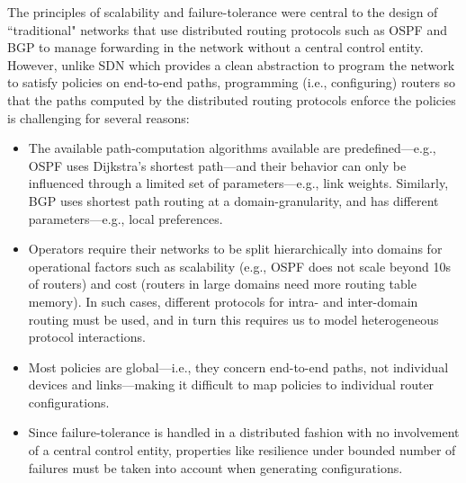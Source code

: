 The principles of scalability and failure-tolerance 
were central to the design
of ``traditional" networks that use distributed
routing protocols such as OSPF and BGP 
to manage forwarding in the 
network without a central control entity.
However, unlike SDN which provides a clean abstraction
to program the network to satisfy policies 
on end-to-end paths,
programming (i.e., configuring) 
routers so that the paths computed by
the distributed routing protocols enforce the 
policies is challenging for several reasons: 
\begin{itemize}
\item The available path-computation algorithms
available are predefined---e.g., OSPF uses
Dijkstra's shortest path---and their behavior can only be influenced
through a limited set of parameters---e.g.,
link weights. Similarly, BGP uses shortest
path routing at a domain-granularity, and has different
parameters---e.g., local preferences.  
\item Operators require their networks to be split hierarchically into
  domains for operational factors such as scalability (e.g., OSPF does
  not scale beyond 10s of routers) and cost (routers in large domains
  need more routing table memory). In such cases, different protocols
  for intra- and inter-domain routing must be used, and in turn this
  requires us to model heterogeneous protocol interactions.
\item Most policies are
global---i.e., they concern end-to-end paths, not individual devices and
links---making it difficult to map policies to
individual router configurations. 
\item Since failure-tolerance is handled in a distributed 
fashion with no involvement of a central control entity,  
properties like resilience under bounded
number of failures must be taken into account when
generating  configurations. 

\end{itemize}


